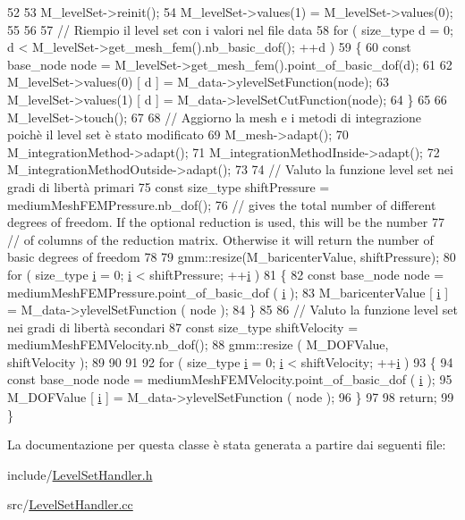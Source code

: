 \begin{DoxyCode}
52 
53     M\_levelSet->reinit();
54     M\_levelSet->values(1) = M\_levelSet->values(0);
55 
56 
57     \textcolor{comment}{// Riempio il level set con i valori nel file data}
58     \textcolor{keywordflow}{for} ( size\_type d = 0; d < M\_levelSet->get\_mesh\_fem().nb\_basic\_dof(); ++d )
59     \{
60         \textcolor{keyword}{const} base\_node node = M\_levelSet->get\_mesh\_fem().point\_of\_basic\_dof(d);
61 
62         M\_levelSet->values(0) [ d ] = M\_data->ylevelSetFunction(node);
63         M\_levelSet->values(1) [ d ] = M\_data->levelSetCutFunction(node);
64     \}
65 
66     M\_levelSet->touch();
67 
68     \textcolor{comment}{// Aggiorno la mesh e i metodi di integrazione poichè il level set è stato modificato}
69     M\_mesh->adapt();
70     M\_integrationMethod->adapt();
71     M\_integrationMethodInside->adapt();
72     M\_integrationMethodOutside->adapt();
73 
74     \textcolor{comment}{// Valuto la funzione level set nei gradi di libertà primari}
75     \textcolor{keyword}{const} size\_type shiftPressure = mediumMeshFEMPressure.nb\_dof();
76     \textcolor{comment}{// gives the total number of different degrees of freedom. If the optional reduction is used, this will
       be the number}
77     \textcolor{comment}{// of columns of the reduction matrix. Otherwise it will return the number of basic degrees of freedom}
78 
79     gmm::resize(M\_baricenterValue, shiftPressure);
80     \textcolor{keywordflow}{for} ( size\_type \hyperlink{matrici_8m_a6f6ccfcf58b31cb6412107d9d5281426}{i} = 0; \hyperlink{matrici_8m_a6f6ccfcf58b31cb6412107d9d5281426}{i} < shiftPressure; ++\hyperlink{matrici_8m_a6f6ccfcf58b31cb6412107d9d5281426}{i} )
81     \{
82         \textcolor{keyword}{const} base\_node node = mediumMeshFEMPressure.point\_of\_basic\_dof ( \hyperlink{matrici_8m_a6f6ccfcf58b31cb6412107d9d5281426}{i} );
83         M\_baricenterValue [ \hyperlink{matrici_8m_a6f6ccfcf58b31cb6412107d9d5281426}{i} ] = M\_data->ylevelSetFunction ( node );
84     \}
85 
86     \textcolor{comment}{// Valuto la funzione level set nei gradi di libertà secondari}
87     \textcolor{keyword}{const} size\_type shiftVelocity = mediumMeshFEMVelocity.nb\_dof();
88     gmm::resize ( M\_DOFValue, shiftVelocity );
89 
90 
91 
92     \textcolor{keywordflow}{for} ( size\_type \hyperlink{matrici_8m_a6f6ccfcf58b31cb6412107d9d5281426}{i} = 0; \hyperlink{matrici_8m_a6f6ccfcf58b31cb6412107d9d5281426}{i} < shiftVelocity; ++\hyperlink{matrici_8m_a6f6ccfcf58b31cb6412107d9d5281426}{i} )
93     \{
94         \textcolor{keyword}{const} base\_node node = mediumMeshFEMVelocity.point\_of\_basic\_dof ( \hyperlink{matrici_8m_a6f6ccfcf58b31cb6412107d9d5281426}{i} );
95         M\_DOFValue [ \hyperlink{matrici_8m_a6f6ccfcf58b31cb6412107d9d5281426}{i} ] = M\_data->ylevelSetFunction ( node );
96     \}
97 
98     \textcolor{keywordflow}{return};
99 \}
\end{DoxyCode}


La documentazione per questa classe è stata generata a partire dai seguenti file\-:\begin{DoxyCompactItemize}
\item 
include/\hyperlink{LevelSetHandler_8h}{Level\-Set\-Handler.\-h}\item 
src/\hyperlink{LevelSetHandler_8cc}{Level\-Set\-Handler.\-cc}\end{DoxyCompactItemize}
